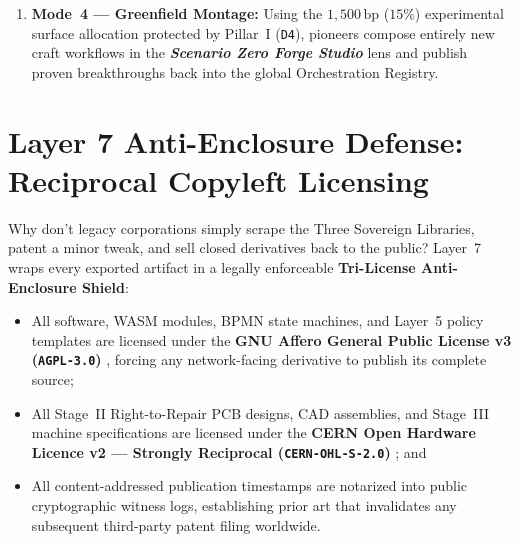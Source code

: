\begin{enumerate}
\begin{lstlisting}[language=C++,caption={Empirical Blueprint Lineage Proof in the Physics Baseline Library (\texttt{storaged\_engine.hpp})}]
    uint16_t spoilage_or_scrap_rate_bp{0};        // [56..57] Material loss in basis points (0..10000)
    uint16_t tier3_hardblock_incidence_bp{0};     // [58..59] Hardware cascade failure rate (bp)
    uint8_t  dominant_fleet_tier{1};              // [60]     0=Scavenged, 1=Hybrid, 2=OpenSpec
    uint8_t  quality_flags{0x02};                 // [61]     Must be 0x02 ATECC608A HardwareRoot
    uint8_t  reserved_pad[2]{0};                  // [62..63] Cache-line alignment padding
};
static_assert(sizeof(ThermodynamicProofRecordV50) == 64,
              "ThermodynamicProofRecordV50 must occupy exactly 64 bytes.");
    \end{lstlisting}
    Lineages are ranked strictly by empirical thermodynamic efficiency, low spoilage, low $\lambda_{\mathrm{ERC}}$, and high \texttt{observed\_mtbf\_sec}.
    \item \textbf{Mode~4 --- Greenfield Montage:} Using the $1{,}500\,\mathrm{bp}$ ($15\%$) experimental surface allocation protected by Pillar~I (\texttt{D4}), pioneers compose entirely new craft workflows in the \textbf{\textit{Scenario Zero Forge Studio}} lens and publish proven breakthroughs back into the global Orchestration Registry.
\end{enumerate}

\section{Layer 7 Anti-Enclosure Defense: Reciprocal Copyleft Licensing}
\label{sec:l7-anti-enclosure-copyleft}

Why don't legacy corporations simply scrape the Three Sovereign Libraries, patent a minor tweak, and sell closed derivatives back to the public? Layer~7 wraps every exported artifact in a legally enforceable \textbf{Tri-License Anti-Enclosure Shield}:
\begin{itemize}
    \item All software, WASM modules, BPMN state machines, and Layer~5 policy templates are licensed under the \textbf{GNU Affero General Public License v3 (\texttt{AGPL-3.0})} \parencite{agplv3}, forcing any network-facing derivative to publish its complete source;
    \item All Stage~II Right-to-Repair PCB designs, CAD assemblies, and Stage~III machine specifications are licensed under the \textbf{CERN Open Hardware Licence v2 --- Strongly Reciprocal (\texttt{CERN-OHL-S-2.0})} \parencite{cern_ohl_v2}; and
    \item All content-addressed publication timestamps are notarized into public cryptographic witness logs, establishing prior art that invalidates any subsequent third-party patent filing worldwide.
\end{itemize}
